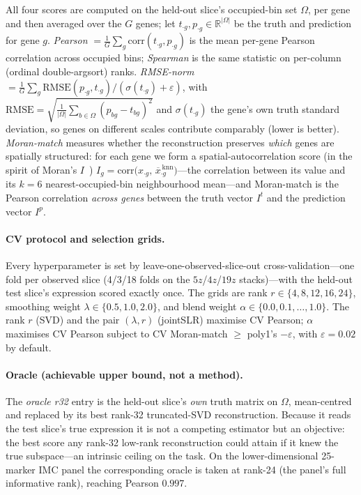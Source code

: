 \documentclass[10pt,letterpaper]{article}
\begin{document}
All four scores are computed on the held-out slice's occupied-bin set $\Omega$, per gene and
then averaged over the $G$ genes; let $t_{\cdot g},p_{\cdot g}\in\mathbb{R}^{|\Omega|}$ be the
truth and prediction for gene $g$.
\emph{Pearson} $=\frac{1}{G}\sum_g \mathrm{corr}(t_{\cdot g},p_{\cdot g})$ is the mean per-gene
Pearson correlation across occupied bins; \emph{Spearman} is the same statistic on per-column
(ordinal double-argsort) ranks.
\emph{RMSE-norm} $=\frac{1}{G}\sum_g \mathrm{RMSE}(p_{\cdot g},t_{\cdot g})/(\sigma(t_{\cdot g})+\varepsilon)$,
with $\mathrm{RMSE}=\sqrt{\frac{1}{|\Omega|}\sum_{b\in\Omega}(p_{bg}-t_{bg})^2}$ and
$\sigma(t_{\cdot g})$ the gene's own truth standard deviation, so genes on different scales
contribute comparably (lower is better).
\emph{Moran-match} measures whether the reconstruction preserves \emph{which} genes are
spatially structured: for each gene we form a spatial-autocorrelation score (in the spirit of
Moran's $I$~\cite{Moran1950Autocorrelation})
$I_g=\mathrm{corr}\big(x_{\cdot g},\,\overline{x}^{\,\mathrm{knn}}_{\cdot g}\big)$---the
correlation between its value and its $k{=}6$ nearest-occupied-bin neighbourhood mean---and
Moran-match is the Pearson correlation \emph{across genes} between the truth vector $I^{t}$ and
the prediction vector $I^{p}$.

\paragraph{CV protocol and selection grids.}
Every hyperparameter is set by leave-one-observed-slice-out cross-validation---one fold per
observed slice (4/3/18 folds on the $5z$/$4z$/$19z$ stacks)---with the held-out test slice's
expression scored exactly once. The grids are rank $r\in\{4,8,12,16,24\}$, smoothing weight
$\lambda\in\{0.5,1.0,2.0\}$, and blend weight $\alpha\in\{0.0,0.1,\dots,1.0\}$. The rank $r$
(SVD) and the pair $(\lambda,r)$ (jointSLR) maximise CV Pearson; $\alpha$ maximises CV Pearson
subject to CV Moran-match $\ge$ poly1's $-\varepsilon$, with $\varepsilon{=}0.02$ by default.

\paragraph{Oracle (achievable upper bound, not a method).}
The \emph{oracle r32} entry is the held-out slice's \emph{own} truth matrix on $\Omega$,
mean-centred and replaced by its best rank-32 truncated-SVD reconstruction. Because it reads the
test slice's true expression it is not a competing estimator but an objective: the best score any
rank-32 low-rank reconstruction could attain if it knew the true subspace---an intrinsic ceiling
on the task. On the lower-dimensional 25-marker IMC panel the corresponding oracle is taken at
rank-24 (the panel's full informative rank), reaching Pearson $0.997$.
\end{document}
